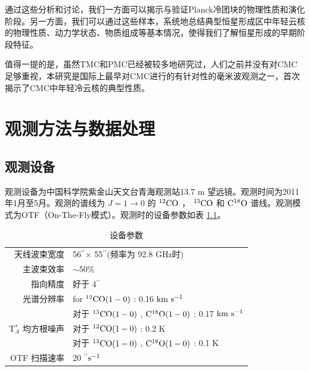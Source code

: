 \documentclass[UTF8, nocolorlinks]{pkuthss}
\newcommand{\coa}{$\rm ^{12}CO$ }
\newcommand{\cob}{$\rm ^{13}CO$ }
\newcommand{\coc}{$\rm C^{18}O$ }
\newcommand{\coaa}{$\rm^{12}CO(1-0)$ }
\newcommand{\cobb}{$\rm^{13}CO(1-0)$ }
\newcommand{\cocc}{$\rm C^{18}O(1-0)$ }
\newcommand{\kms}{$\rm km\ s^{-1}$}
\newcommand{\arcsec}{$^{\prime\prime}$}
\begin{document}
		通过这些分析和讨论，我们一方面可以揭示与验证Planck冷团块的物理性质和演化阶段。另一方面，我们可以通过这些样本，系统地总结典型恒星形成区中年轻云核的物理性质、动力学状态、物质组成等基本情况，使得我们了解恒星形成的早期阶段特征。

		值得一提的是，虽然TMC和PMC已经被较多地研究过，人们之前并没有对CMC足够重视，本研究是国际上最早对CMC进行的有针对性的毫米波观测之一，首次揭示了CMC中年轻冷云核的典型性质。

\chapter{观测方法与数据处理}

	\section{观测设备}
		观测设备为中国科学院紫金山天文台青海观测站13.7 m 望远镜。观测时间为2011年1月至5月。观测的谱线为 $J=1 \rightarrow 0 $ 的  \coa， \cob 和 \coc 谱线。观测模式为OTF（On-The-Fly模式）。观测时的设备参数如表 \ref{Fig.Observation}。

		\begin{table}[H]
	        \begin{center}
	        \caption{设备参数\label{Fig.Observation}}
	        \setlength{\tabcolsep}{0.1in}
	        \vspace{0.5em}
	        \begin{tabular}{rl}
	        \toprule
	        \hline
	        天线波束宽度 & 56\arcsec$\times$ 55\arcsec (频率为 92.8 GHz时) \\
	        主波束效率 & $\sim$50\%                               \\
	        指向精度   & 好于 4\arcsec                     \\
	        光谱分辨率  & for \coaa: 0.16 \kms                     \\
	                             & 对于 \cobb, \cocc:  0.17 \kms           \\
	        T$^*_A$ 均方根噪声    & 对于 \coaa: 0.2 K                         \\
	                             & 对于 \cobb, \cocc: 0.1 K               \\
	        OTF 扫描速率          & 20 \arcsec $\rm s^{-1}$\\
	        \hline
	        \bottomrule
	        \end{tabular}
	        \end{center}
        \end{table}
\end{document}

